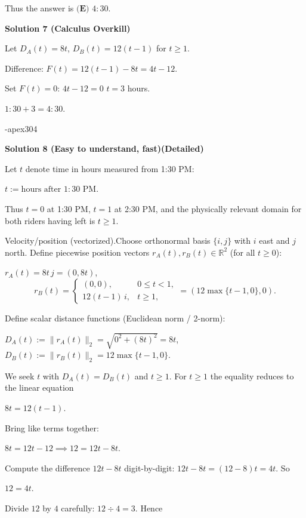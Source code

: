 \begin{enumerate}
 Thus the answer is $\boxed{\textbf{(E) } 4{:}30}$.

 



\textbf{Solution 7 (Calculus Overkill)}

Let  $D_A(t) = 8t$,  $D_B(t) = 12(t-1)$ for $t \ge 1$.

 Difference:  $F(t) = 12(t-1) - 8t = 4t - 12$.

 Set $F(t)=0$:  $4t - 12 = 0$ $t = 3$ hours.

 $1{:}30 + 3 = 4{:}30$.

 -apex304

 



\textbf{Solution 8 (Easy to understand, fast)(Detailed)}

Let \( t \) denote time in hours measured from 1:30 PM:

 \( t := \text{hours after } 1:30 \text{ PM} \).

 Thus \( t = 0 \) at 1:30 PM, \( t = 1 \) at 2:30 PM, and the physically relevant domain for both riders having left is \( t \geq 1 \).

 Velocity/position (vectorized).Choose orthonormal basis \( \{ i, j \} \) with \( i \) east and \( j \) north. Define piecewise position vectors \( r_A(t), r_B(t) \in \mathbb{R}^2 \) (for all \( t \geq 0 \)):

 \( r_A(t) = 8t \, j = (0, 8t) \),
 \[r_B(t) = \begin{cases} (0, 0), & 0 \leq t < 1, \\ 12(t - 1) \, i, & t \geq 1, \end{cases} = (12 \max\{t - 1, 0\}, 0).\]

 Define scalar distance functions (Euclidean norm / 2-norm):

 \( D_A(t) := \| r_A(t) \|_2 = \sqrt{0^2 + (8t)^2} = 8t \),\( D_B(t) := \| r_B(t) \|_2 = 12 \max\{t - 1, 0\} \).

 We seek \( t \) with \( D_A(t) = D_B(t) \) and \( t \geq 1 \). For \( t \geq 1 \) the equality reduces to the linear equation

 \( 8t = 12(t - 1) \).

 Bring like terms together:

 \( 8t = 12t - 12 \implies 12 = 12t - 8t \).

 Compute the difference \( 12t - 8t \) digit-by-digit: \( 12t - 8t = (12 - 8)t = 4t \). So

 \( 12 = 4t \).

 Divide \( 12 \) by \( 4 \) carefully: \( 12 \div 4 = 3 \). Hence


\end{enumerate}
